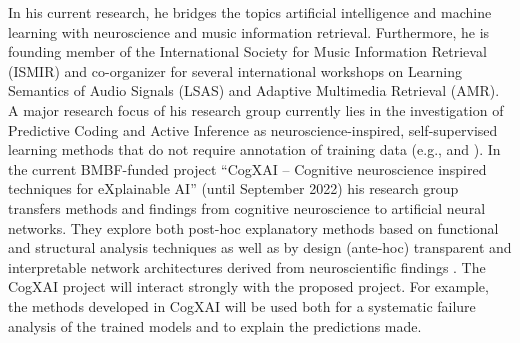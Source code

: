 \documentclass[11pt]{article}
\newcommand{\todo}[1]{\textcolor{red}{#1}}
\begin{document}
In his current research, he bridges the topics artificial intelligence and machine learning with neuroscience and music information retrieval. 
Furthermore, he is founding member of the International Society for Music Information Retrieval (ISMIR) and co-organizer for several international workshops on Learning Semantics of Audio Signals (LSAS) and Adaptive Multimedia Retrieval (AMR).
A major research focus of his research group currently lies in the investigation of
Predictive Coding and Active Inference as neuroscience-inspired, self-supervised learning methods that do not require annotation of training data (e.g.,  and \cite{rane2020icmr,ofner2020smc}).
%
In the current BMBF-funded project ``CogXAI -- Cognitive neuroscience inspired techniques for eXplainable AI'' (until September 2022) his research group transfers methods and findings from cognitive neuroscience to artificial neural networks. 
They explore both post-hoc explanatory methods based on functional and structural analysis techniques as well as by design (ante-hoc) transparent and interpretable network architectures derived from neuroscientific findings
 \cite{krug2020gradient}.
The CogXAI project will interact strongly with the proposed project.
For example, the methods developed in CogXAI will be used both for a systematic failure analysis of the trained models and to explain the predictions made.\\
\end{document}
